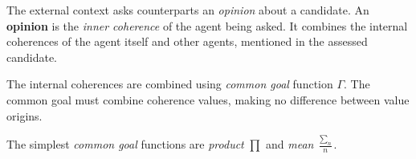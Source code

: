 \documentclass[../ThesisDoc]{subfiles}
\begin{document}
\providecommand{\rootdir}{..}

The external context asks counterparts an \emph{opinion} about a candidate.
An \textbf{opinion} is the \emph{inner coherence} of the agent being asked.
It combines the internal coherences of the agent itself and other agents,
mentioned in the assessed candidate.



The internal coherences are combined using \emph{common goal} function $\Gamma$.
The common goal must combine coherence values, making no difference
between value origins.

The simplest \emph{common goal} functions are \emph{product} $\prod$
and \emph{mean} $\frac{\sum_n}{n}$.


\end{document}

